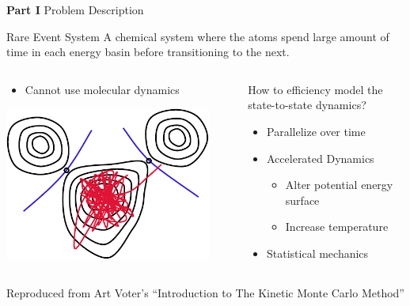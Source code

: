 \documentclass[onlymath]{beamer}
\begin{document}
\begin{frame}{\textbf{Part I} Problem Description}

  \begin{block}{Rare Event System}
    A chemical system where the atoms spend large amount of time in each energy basin
    before transitioning to the next.
  \end{block}

  \begin{columns}[T]

    \begin{column}[l]{0.5\textwidth}
      \begin{itemize}

        \item Cannot use molecular dynamics
      \end{itemize}
      \includegraphics[width=0.9\textwidth]{images/rare-event}

    \end{column}

    \begin{column}[r]{0.5\textwidth}

      How to efficiency model the state-to-state dynamics? 

      \begin{itemize}
        \item Parallelize over time
        \item Accelerated Dynamics
          \begin{itemize}
            \item Alter potential energy surface
            \item Increase temperature
          \end{itemize}
        \item \alert<2>{Statistical mechanics}
      \end{itemize}
    \end{column}
  \end{columns}
  \vspace{2mm}
  \tiny
  Reproduced from Art Voter's ``Introduction to The Kinetic Monte Carlo Method''

\end{frame}
\end{document}

